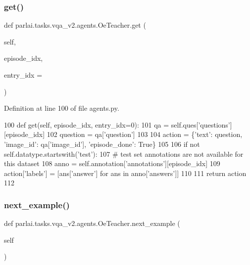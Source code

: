 \subsubsection{\texorpdfstring{get()}{get()}}
{\footnotesize\ttfamily def parlai.\+tasks.\+vqa\+\_\+v2.\+agents.\+Oe\+Teacher.\+get (\begin{DoxyParamCaption}\item[{}]{self,  }\item[{}]{episode\+\_\+idx,  }\item[{}]{entry\+\_\+idx = {} }\end{DoxyParamCaption})}



Definition at line 100 of file agents.\+py.


\begin{DoxyCode}
100     \textcolor{keyword}{def }get(self, episode\_idx, entry\_idx=0):
101         qa = self.ques[\textcolor{stringliteral}{'questions'}][episode\_idx]
102         question = qa[\textcolor{stringliteral}{'question'}]
103 
104         action = \{\textcolor{stringliteral}{'text'}: question, \textcolor{stringliteral}{'image\_id'}: qa[\textcolor{stringliteral}{'image\_id'}], \textcolor{stringliteral}{'episode\_done'}: \textcolor{keyword}{True}\}
105 
106         \textcolor{keywordflow}{if} \textcolor{keywordflow}{not} self.datatype.startswith(\textcolor{stringliteral}{'test'}):
107             \textcolor{comment}{# test set annotations are not available for this dataset}
108             anno = self.annotation[\textcolor{stringliteral}{'annotations'}][episode\_idx]
109             action[\textcolor{stringliteral}{'labels'}] = [ans[\textcolor{stringliteral}{'answer'}] \textcolor{keywordflow}{for} ans \textcolor{keywordflow}{in} anno[\textcolor{stringliteral}{'answers'}]]
110 
111         \textcolor{keywordflow}{return} action
112 
\end{DoxyCode}
\mbox{\label{classparlai_1_1tasks_1_1vqa__v2_1_1agents_1_1OeTeacher_aa1bd8754bec6bafbc67231d5fecb14b6}} 
\subsubsection{\texorpdfstring{next\+\_\+example()}{next\_example()}}
{\footnotesize\ttfamily def parlai.\+tasks.\+vqa\+\_\+v2.\+agents.\+Oe\+Teacher.\+next\+\_\+example (\begin{DoxyParamCaption}\item[{}]{self }\end{DoxyParamCaption})}

